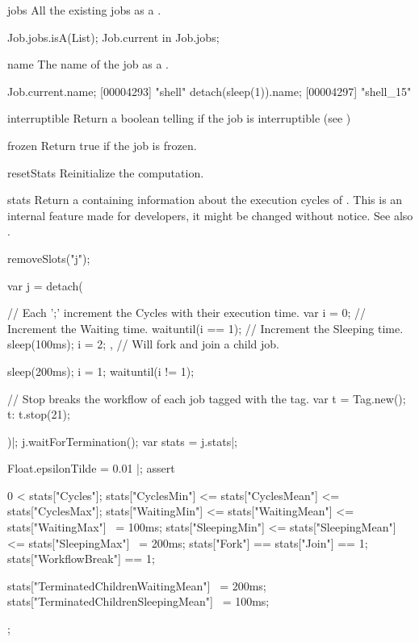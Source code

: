\begin{urbiscriptapi}
\item[jobs]%
  All the existing jobs as a .
\begin{urbiassert}
Job.jobs.isA(List);
Job.current in Job.jobs;
\end{urbiassert}


\item[name] The name of the job as a .
\begin{urbiscript}
Job.current.name;
[00004293] "shell"
detach(sleep(1)).name;
[00004297] "shell_15"
\end{urbiscript}

\item[interruptible]%
  Return a boolean telling if the job is interruptible (see )

\item[frozen]%
  Return true if the job is frozen.

\item[resetStats]%
  Reinitialize the  computation.


\item[stats]%
  Return a  containing information about the execution
  cycles of \urbi.  This is an internal feature made for developers, it
  might be changed without notice.  See also .
\begin{urbicomment}
removeSlots("j");
\end{urbicomment}
\begin{urbiscript}
var j = detach({
  // Each ';' increment the Cycles with their execution time.
  var i = 0;
  {
    // Increment the Waiting time.
    waituntil(i == 1);
    // Increment the Sleeping time.
    sleep(100ms);
    i = 2;
  }, // Will fork and join a child job.

  sleep(200ms);
  i = 1;
  waituntil(i != 1);

  // Stop breaks the workflow of each job tagged with the tag.
  var t = Tag.new();
  t: t.stop(21);
})|;
j.waitForTermination();
var stats = j.stats|;

Float.epsilonTilde = 0.01 |;
assert
{
  0 < stats["Cycles"];
  stats["CyclesMin"] <= stats["CyclesMean"] <= stats["CyclesMax"];
  stats["WaitingMin"] <= stats["WaitingMean"] <= stats["WaitingMax"] ~= 100ms;
  stats["SleepingMin"] <= stats["SleepingMean"] <= stats["SleepingMax"] ~= 200ms;
  stats["Fork"] == stats["Join"] == 1;
  stats["WorkflowBreak"] == 1;

  stats["TerminatedChildrenWaitingMean"] ~= 200ms;
  stats["TerminatedChildrenSleepingMean"] ~= 100ms;
};
\end{urbiscript}



\end{urbiscriptapi}
